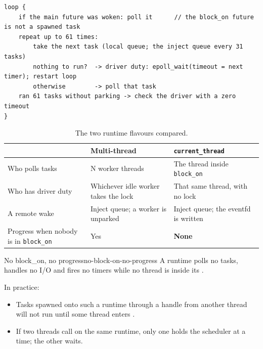 \begin{lstlisting}[language={}, caption={The \texttt{current\_thread} scheduler loop, paraphrased from Tokio's source.}, label=lst:wakers-11.2]
loop {
    if the main future was woken: poll it      // the block_on future is not a spawned task
    repeat up to 61 times:
        take the next task (local queue; the inject queue every 31 tasks)
        nothing to run?  -> driver duty: epoll_wait(timeout = next timer); restart loop
        otherwise        -> poll that task
    ran 61 tasks without parking -> check the driver with a zero timeout
}
\end{lstlisting}

\begin{table}[htbp]
    \centering\small
    \begin{tabularx}{\linewidth}{>{\raggedright\arraybackslash}p{4.4cm} Y Y}
        \toprule
         & \textbf{Multi-thread} & \textbf{\texttt{current\_thread}} \\
        \midrule
        Who polls tasks & N worker threads & The thread inside \texttt{block\_on} \\
        Who has driver duty & Whichever idle worker takes the lock & That same thread, with no lock \\
        A remote wake & Inject queue; a worker is unparked & Inject queue; the eventfd is written \\
        Progress when nobody is in \texttt{block\_on} & Yes & \textbf{None} \\
        \bottomrule
    \end{tabularx}
    \caption{The two runtime flavours compared.}
    \label{tab:wakers-11.2}
\end{table}

\begin{corollary}{No block\_on, no progress}{no-block-on-no-progress}
    A  runtime polls no tasks, handles no I/O and fires no timers while no thread is inside its .
\end{corollary}

In practice:

\begin{itemize}
    \item Tasks spawned onto such a runtime through a handle from another thread will not run until some thread enters .
    \item If two threads call  on the same  runtime, only one holds the scheduler at a time; the other waits.
\end{itemize}

